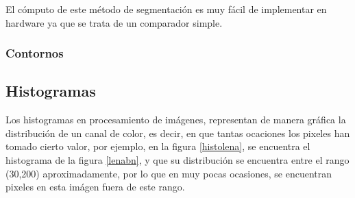 \documentclass[twoside,spanish,ESP,MSc]{plantillaLabUPV}
\theoremstyle{definition}
\begin{document}
El cómputo de este método de segmentación es muy fácil de implementar en hardware ya que se trata de un comparador simple.

\subsubsection{Contornos}

\subsection{Histogramas}
Los histogramas en procesamiento de imágenes, representan de manera gráfica la distribución de un canal de color, es decir, en que tantas ocaciones los pixeles han tomado cierto valor,  por ejemplo, en la figura \ref{histolena}, se encuentra el histograma de la figura \ref{lenabn}, y que su distribución se encuentra entre el rango (30,200) aproximadamente, por lo que en muy pocas ocasiones, se encuentran pixeles en esta imágen fuera de este rango.
\end{document}
